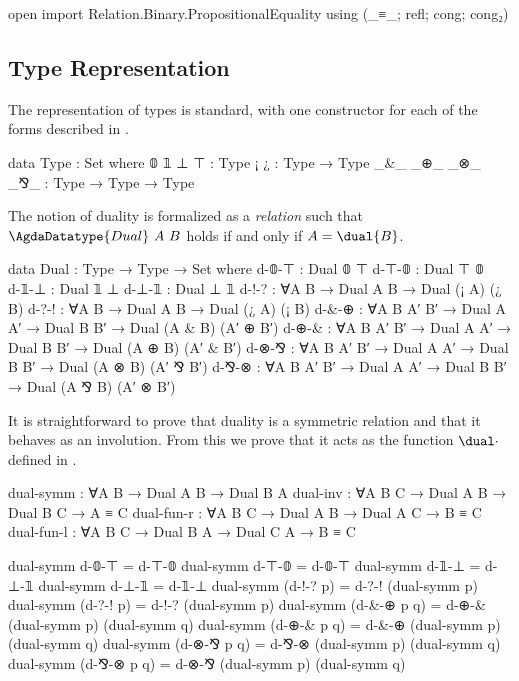 \begin{code}[hide]
open import Relation.Binary.PropositionalEquality using (_≡_; refl; cong; cong₂)
\end{code}

\subsection{Type Representation}
\label{sec:type-agda}

The representation of types is standard, with one constructor for each of the
forms described in .

\begin{code}
data Type : Set where
  𝟘 𝟙 ⊥ ⊤          : Type
  ¡ ¿              : Type → Type
  _&_ _⊕_ _⊗_ _⅋_  : Type → Type → Type
\end{code}

The notion of duality is formalized as a \emph{relation} 
such that $\AgdaDatatype{Dual}~A~B$ holds if and only if $A = \dual{B}$.

\begin{code}
data Dual : Type → Type → Set where
  d-𝟘-⊤  : Dual 𝟘 ⊤
  d-⊤-𝟘  : Dual ⊤ 𝟘
  d-𝟙-⊥  : Dual 𝟙 ⊥
  d-⊥-𝟙  : Dual ⊥ 𝟙
  d-!-?  : ∀{A B} → Dual A B → Dual (¡ A) (¿ B)
  d-?-!  : ∀{A B} → Dual A B → Dual (¿ A) (¡ B)
  d-&-⊕  : ∀{A B A′ B′} → Dual A A′ → Dual B B′ → Dual (A & B) (A′ ⊕ B′)
  d-⊕-&  : ∀{A B A′ B′} → Dual A A′ → Dual B B′ → Dual (A ⊕ B) (A′ & B′)
  d-⊗-⅋  : ∀{A B A′ B′} → Dual A A′ → Dual B B′ → Dual (A ⊗ B) (A′ ⅋ B′)
  d-⅋-⊗  : ∀{A B A′ B′} → Dual A A′ → Dual B B′ → Dual (A ⅋ B) (A′ ⊗ B′)
\end{code}

It is straightforward to prove that duality is a symmetric relation and that it
behaves as an involution. From this we prove that it acts as the function
$\dual\cdot$ defined in .

\begin{code}
dual-symm   : ∀{A B} → Dual A B → Dual B A
dual-inv    : ∀{A B C} → Dual A B → Dual B C → A ≡ C
dual-fun-r  : ∀{A B C} → Dual A B → Dual A C → B ≡ C
dual-fun-l  : ∀{A B C} → Dual B A → Dual C A → B ≡ C
\end{code}
\begin{code}[hide]
dual-symm d-𝟘-⊤ = d-⊤-𝟘
dual-symm d-⊤-𝟘 = d-𝟘-⊤
dual-symm d-𝟙-⊥ = d-⊥-𝟙
dual-symm d-⊥-𝟙 = d-𝟙-⊥
dual-symm (d-!-? p) = d-?-! (dual-symm p)
dual-symm (d-?-! p) = d-!-? (dual-symm p)
dual-symm (d-&-⊕ p q) = d-⊕-& (dual-symm p) (dual-symm q)
dual-symm (d-⊕-& p q) = d-&-⊕ (dual-symm p) (dual-symm q)
dual-symm (d-⊗-⅋ p q) = d-⅋-⊗ (dual-symm p) (dual-symm q)
dual-symm (d-⅋-⊗ p q) = d-⊗-⅋ (dual-symm p) (dual-symm q)
\end{code}

